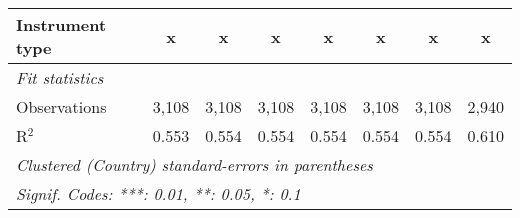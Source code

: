 \begin{table}[htbp]
\begin{tabular}{lccccccc}
      Instrument type                                                           & x            & x            & x            & x            & x            & x            & x\\  
      \midrule \emph{Fit statistics}\\
      Observations                                                              & 3,108        & 3,108        & 3,108        & 3,108        & 3,108        & 3,108        & 2,940\\  
      R$^2$                                                                     & 0.553        & 0.554        & 0.554        & 0.554        & 0.554        & 0.554        & 0.610\\  
      \midrule
      \multicolumn{8}{l}{\emph{Clustered (Country) standard-errors in parentheses}}\\
      \multicolumn{8}{l}{\emph{Signif. Codes: ***: 0.01, **: 0.05, *: 0.1}}\\
   \end{tabular}
\end{table}


